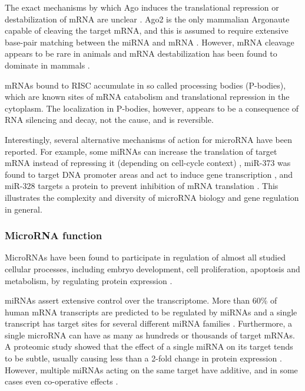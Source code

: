 The exact mechanisms by which Ago induces the translational repression or
destabilization of mRNA are unclear \citep{Filipowicz2008}. Ago2 is the only mammalian
Argonaute capable of cleaving the target mRNA, and this is assumed to require
extensive base-pair matching between the miRNA and mRNA \citep{Du2005}. However,
mRNA cleavage appears to be rare in animals and mRNA destabilization
has been found to dominate in mammals \citep{Guo2010}.

mRNAs bound to RISC accumulate in so called processing bodies (P-bodies),
which are known sites of mRNA catabolism and translational repression in the
cytoplasm. The localization in P-bodies, however, appears to be a consequence
of RNA silencing and decay, not the cause, and is reversible.
\citep{Eulalio2007}

Interestingly, several alternative mechanisms of action for microRNA have been
reported. For example, some miRNAs can increase the translation of target mRNA instead of
repressing it (depending on cell-cycle context) \citep{Vasudevan2007}, miR-373
was found to target DNA promoter areas and act to induce gene transcription
\citep{Place2008}, and miR-328 targets a protein to prevent inhibition of mRNA
translation \citep{Eiring2010}. This illustrates the complexity and diversity of
microRNA biology and gene regulation in general.






\subsubsection{MicroRNA function}\label{microrna-function}

MicroRNAs have been found to participate in regulation of almost all studied
cellular processes, including embryo development, cell proliferation,
apoptosis and metabolism, by regulating protein expression \cite{}.

miRNAs assert extensive control over the transcriptome. More than 60\% of
human mRNA transcripts are predicted to be regulated by miRNAs and a single
transcript has target sites for several different miRNA families
\citep{Friedman2008}. Furthermore, a single microRNA can have as many as hundreds or
thousands of target mRNAs. A proteomic study showed that the effect of a
single miRNA on its target tends to be subtle, usually causing less than a
2-fold change in protein expression \citep{Baek2008}. However, multiple miRNAs
acting on the same target have additive, and in some cases even co-operative
effects \citep{Bartel2009}.

